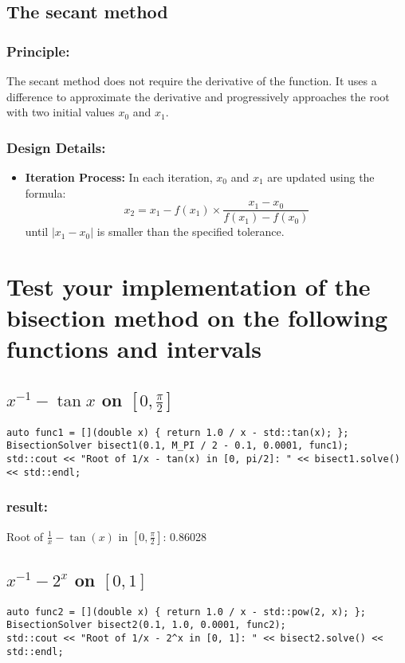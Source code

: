 \documentclass[a4paper]{article}
\begin{document}
\subsection*{The secant method}
\subsubsection*{Principle:} The secant method does not require the derivative of the function. It uses a difference to approximate the derivative and progressively approaches the root with two initial values \( x_0 \) and \( x_1 \).
\subsubsection*{Design Details:}
\begin{itemize}
    \item \textbf{Iteration Process:} In each iteration, \( x_0 \) and \( x_1 \) are updated using the formula:
    \[
    x_2 = x_1 - f(x_1) \times \frac{x_1 - x_0}{f(x_1) - f(x_0)}
    \]
    until \( |x_1 - x_0| \) is smaller than the specified tolerance.
\end{itemize}

\section{Test your implementation of the bisection method on the
following functions and intervals}
\subsection{\( x^{-1} - \tan x \) on \(\left[ 0, \frac{\pi}{2} \right]\)}
\begin{lstlisting}
auto func1 = [](double x) { return 1.0 / x - std::tan(x); };
BisectionSolver bisect1(0.1, M_PI / 2 - 0.1, 0.0001, func1);
std::cout << "Root of 1/x - tan(x) in [0, pi/2]: " << bisect1.solve() << std::endl;
\end{lstlisting}
\subsubsection*{result:}
Root of $\frac{1}{x} - \tan(x)$ in $[0, \frac{\pi}{2}]$: 0.86028
\subsection{\( x^{-1} - 2^x \) on \([0, 1]\)}
\begin{lstlisting}
auto func2 = [](double x) { return 1.0 / x - std::pow(2, x); };
BisectionSolver bisect2(0.1, 1.0, 0.0001, func2);
std::cout << "Root of 1/x - 2^x in [0, 1]: " << bisect2.solve() << std::endl;
\end{lstlisting}
\end{document}
